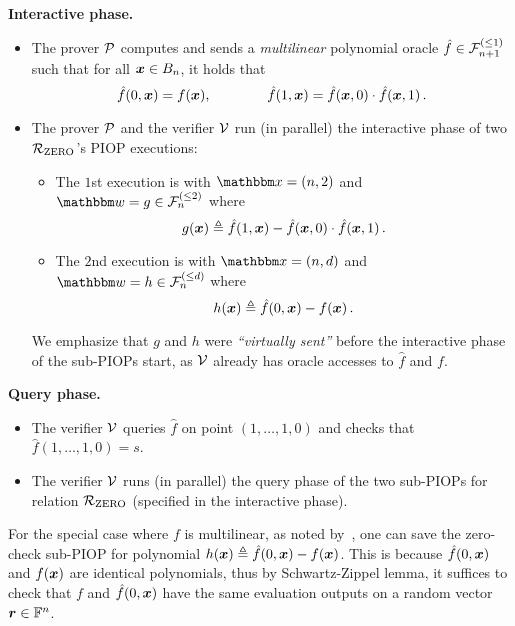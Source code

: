 \textbf{Interactive phase.} 
\begin{itemize}
    \item The prover $\mathcal{P}$ computes and sends a \emph{multilinear} polynomial oracle 
    $\hat{f} \in {\mathcal{F}}_{n+1}^{(\le{1})}$ such that for all $\boldsymbol{x} \in B_{n}$, it holds that
    \[
      \hat{f}(0, \boldsymbol{x}) = f(\boldsymbol{x}), \qquad \qquad \hat{f}(1, \boldsymbol{x}) = \hat{f}(\boldsymbol{x}, 0) \cdot \hat{f}(\boldsymbol{x}, 1)\,.
    \]
    \item The prover $\mathcal{P}$ and the verifier $\mathcal{V}$ run (in parallel) the interactive phase 
    of two ${\mathcal{R}}_{\text{ZERO}}$'s PIOP executions:
    \begin{itemize}
        \item The $1$st execution is with $\instR = (n, 2)$ and $\witR = g \in \bdp{n}{2}$ where
            \[
                g(\boldsymbol{x}) \mathrel{\triangleq} \hat{f}(1, \boldsymbol{x}) - \hat{f}(\boldsymbol{x}, 0) \cdot \hat{f}(\boldsymbol{x}, 1) \,.
            \]
            
        \item The $2$nd execution is with $\instR = (n, d)$ and $\witR = h \in \bdp{n}{d}$ where
            \[
                h(\boldsymbol{x}) \mathrel{\triangleq}  \hat{f}(0, \boldsymbol{x}) - f(\boldsymbol{x}) \,.
            \]
    \end{itemize}
    We emphasize that $g$ and $h$ were \emph{``virtually sent''} before the interactive phase of the sub-PIOPs start,
    as $\mathcal{V}$ already has oracle accesses to $\hat{f}$ and $f$.
\end{itemize}

\textbf{Query phase.}
\begin{itemize}
    \item The verifier $\mathcal{V}$ queries $\hat{f}$ on point $(1, \dots, 1, 0)$ and checks that
        $\hat{f}(1,\dots, 1, 0) = s$.
    \item The verifier $\mathcal{V}$ runs (in parallel) the query phase of the two sub-PIOPs 
    for relation ${\mathcal{R}}_{\text{ZERO}}$ (specified in the interactive phase).
\end{itemize}

\begin{remark}
    For the special case where $f$ is multilinear, as noted by~\cite{SL20},
    one can save the zero-check sub-PIOP for polynomial $h(\boldsymbol{x}) \mathrel{\triangleq} \hat{f}(0, \boldsymbol{x}) - f(\boldsymbol{x})$. 
    This is because $\hat{f}(0, \boldsymbol{x})$ and $f(\boldsymbol{x})$ are identical polynomials, 
    thus by Schwartz-Zippel lemma, it suffices to check that $f$ and $\hat{f}(0, \boldsymbol{x})$
    have the same evaluation outputs on a random vector $\boldsymbol{r} \in \mathbb{F}^n$.
\end{remark}

